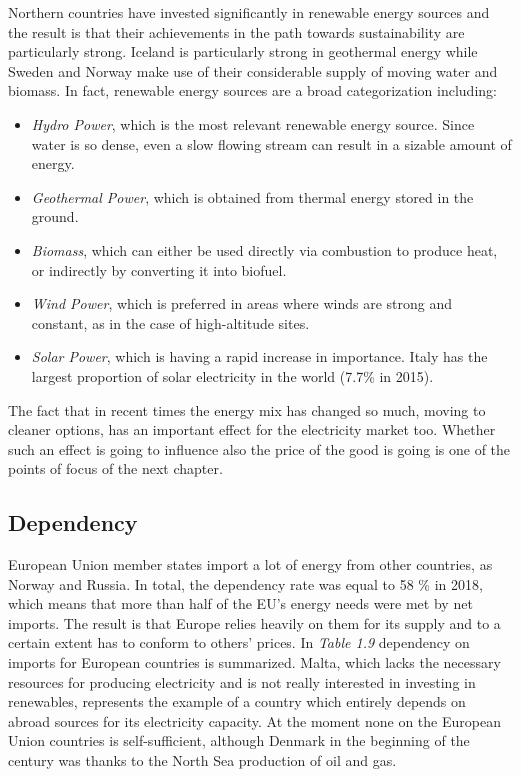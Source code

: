 \documentclass{book}
\begin{document}
Northern countries have invested significantly in renewable energy sources and the result is that their achievements in the path towards sustainability are particularly strong. Iceland is particularly strong in geothermal energy while Sweden and Norway make use of their considerable supply of moving water and biomass. In fact, renewable energy sources are a broad categorization including:

\begin{itemize}
\item \textit{Hydro Power}, which is the most relevant renewable energy source. Since water is so dense, even a slow flowing stream can result in a sizable amount of energy.
\item \textit{Geothermal Power}, which is obtained from thermal energy stored in the ground.
\item \textit{Biomass}, which can either be used directly via combustion to produce heat, or indirectly by converting it into biofuel.
\item \textit{Wind Power}, which is preferred in areas where winds are strong and constant, as in the case of high-altitude sites.
\item \textit{Solar Power}, which is having a rapid increase in importance. Italy has the largest proportion of solar electricity in the world (7.7\% in 2015).
\end{itemize}

The fact that in recent times the energy mix has changed so much, moving to cleaner options, has an important effect for the electricity market too. Whether such an effect is going to influence also the price of the good is going is one of the points of focus of the next chapter.

\subsection{Dependency}

European Union member states import a lot of energy from other countries, as Norway and Russia. In total, the dependency rate was equal to 58 \% in 2018, which means that more than half of the EU’s energy needs were met by net imports. The result is that Europe relies heavily on them for its supply and to a certain extent has to conform to others' prices. In \textit{Table 1.9} dependency on imports for European countries is summarized. Malta, which lacks the necessary resources for producing electricity and is not really interested in investing in renewables, represents the example of a country which entirely depends on abroad sources for its electricity capacity. At the moment none on the European Union countries is self-sufficient, although Denmark in the beginning of the century was thanks to the North Sea production of oil and gas.
\end{document}
